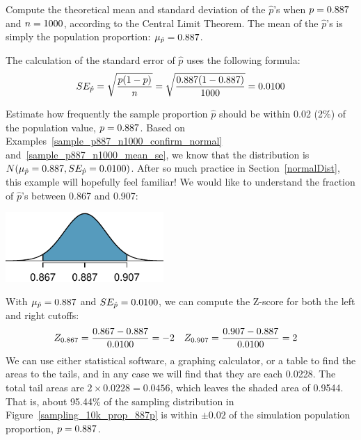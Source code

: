 \begin{example}{Compute the theoretical mean and standard deviation
of the $\hat{p}$'s when
$p = 0.887{}$ and $n = 1000{}$,
according to the
Central Limit Theorem.}\label{sample_p887_n1000_mean_se}
The mean of the $\hat{p}$'s is simply the population proportion:
$\mu_{\hat{p}} = 0.887{}$.

The calculation of the standard error of $\hat{p}$ uses
the following formula:
\begin{align*}
SE_{\hat{p}}
    = \sqrt{\frac{p (1 - p)}{n}}
    = \sqrt{\frac{0.887{} (1 - 0.887{})}{1000}}
    = 0.0100{}
\end{align*}
\end{example}

\begin{example}{Estimate how frequently the sample proportion
$\hat{p}$ should be within 0.02 (2\%) of the population value,
$p = 0.887{}$. Based on
Examples~\ref{sample_p887_n1000_confirm_normal}
and~\ref{sample_p887_n1000_mean_se}, we know that the distribution is
$N(\mu_{\hat{p}} = 0.887{}, SE_{\hat{p}} = 0.0100{})$.}
\label{sampling_10k_prop_887p-prop_from_867_to_907}
After so much practice in Section~\ref{normalDist},
this example will hopefully feel familiar!
We would like to understand the fraction of $\hat{p}$'s
between 0.867 and 0.907:
\begin{center}
\includegraphics[width=60mm]{ch_inference_for_props/figures/p-hat_from_867_and_907/p-hat_from_867_and_907}
\end{center}
With $\mu_{\hat{p}} = 0.887{}$ and
$SE_{\hat{p}} = 0.0100{}$,
we can compute the Z-score for both the left and right cutoffs:
\begin{align*}
Z_{0.867} &= \frac{0.867 - 0.887{}}{0.0100{}} = -2
&Z_{0.907} &= \frac{0.907 - 0.887{}}{0.0100{}} = 2
\end{align*}
We can use either statistical software, a graphing calculator,
or a table to find the areas to the tails, and in any case we
will find that they are each 0.0228. The total tail areas are
$2 \times 0.0228 = 0.0456$, which leaves the shaded area of
0.9544. That is, about 95.44\% of the sampling distribution
in Figure~\ref{sampling_10k_prop_887p} is within $\pm0.02$
of the simulation population proportion, $p = 0.887{}$.
\end{example}

